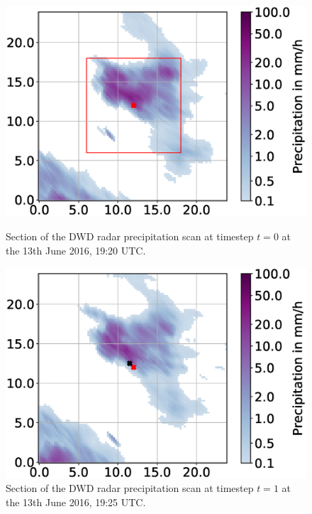 \documentclass[11pt,twoside,a4paper,fleqn,x11names]{report}
\numberwithin{equation}{chapter}
\numberwithin{figure}{chapter}
\numberwithin{table}{chapter}
\begin{document}
\begin{figure}[!htbp]
	\centering
	\begin{minipage}{0.48\textwidth}
		\includegraphics[width=\textwidth,trim={32mm 0 5mm 0},clip]{displacement_t0.eps}
		\caption{Section of the DWD radar precipitation scan at timestep $t=0$ at the 13th June 2016, 19:20 UTC.}
		\label{fig:displacement_t0}
	\end{minipage}\hfill
	\begin{minipage}{0.48\textwidth}
		\includegraphics[width=\textwidth,trim={32mm 0 5mm 0},clip]{displacement_t1.eps}
		\caption{Section of the DWD radar precipitation scan at timestep $t=1$ at the 13th June 2016, 19:25 UTC.}
		\label{fig:displacement_t1}
	\end{minipage}
\end{figure}
\end{document}
